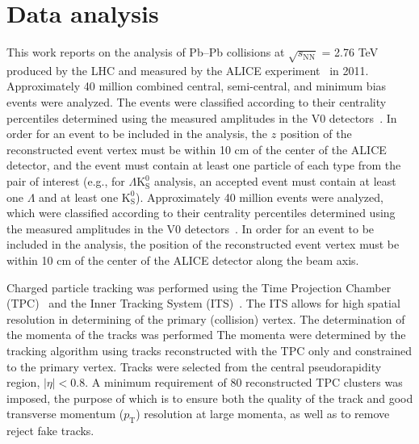 \documentclass[ALICE,manyauthors]{cernphprep}
\newcommand{\pt}{$p_{\mathrm{T}}$\xspace}
\newcommand{\Lam}{$\Lambda$\xspace}
\newcommand{\Ks}{$\mathrm{K^{0}_{S}}$\xspace}
\newcommand{\LamKs}{$\Lambda\mathrm{K^{0}_{S}}$\xspace}
\begin{document}
\section{Data analysis}
\label{sec:DataAnalysis}

This work reports on the analysis of Pb--Pb collisions at $\sqrt{s_{\mathrm{NN}}}$ = 2.76 TeV produced by the LHC and measured by the ALICE experiment~\cite{Aamodt:2008zz} in 2011.
{\color{red}Approximately 40 million combined central, semi-central, and minimum bias events were analyzed.
The events were classified according to their centrality percentiles determined using the measured amplitudes in the V0 detectors~\cite{Abelev:2013qoq}.  
In order for an event to be included in the analysis, the $z$ position of the reconstructed event vertex must be within 10 cm of the center of the ALICE detector, and the event must contain at least one particle of each type from the pair of interest (e.g., for \LamKs analysis, an accepted event must contain at least one \Lam and at least one \Ks).}
{\color{blue}Approximately 40 million events were analyzed, which were classified according to their centrality percentiles determined using the measured amplitudes in the V0 detectors~\cite{Abelev:2013qoq}.  
In order for an event to be included in the analysis, the position of the reconstructed event vertex must be within 10 cm of the center of the ALICE detector along the beam axis.}

Charged particle tracking was performed using the Time Projection Chamber (TPC)~\cite{2010NIMPA.622..316A} and the Inner Tracking System {\color{blue}(ITS)}~\cite{Abelevetal:2014dna}.  
The ITS allows for high spatial resolution {\color{red}in determining} {\color{blue}of} the primary (collision) vertex.
{\color{red}The determination of the momenta of the tracks was performed} {\color{blue}The momenta were determined by the tracking algorithm} using tracks reconstructed with the TPC only and constrained to the primary vertex.
{\color{blue}Tracks were selected from the central pseudorapidity region, $|\eta| < 0.8$.}
A minimum requirement of 80 reconstructed TPC clusters was imposed, the purpose of which is to ensure both the quality of the track and good transverse momentum (\pt) resolution at large momenta, as well as to {\color{red}remove} {\color{blue}reject} fake tracks.
\end{document}
